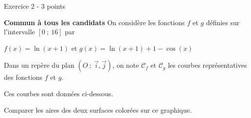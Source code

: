 
%
\begin{h2}Exercice 2 - 3 points\end{h2}
\textbf{Commun à tous les candidats}
On considère les fonctions $f$ et $g$ définies sur l'intervalle $[0~;~16]$ par
\begin{center}$f(x) = \ln(x+1) $ et $g(x) = \ln(x+1)+1-\cos(x)$\end{center}
Dans un repère du plan $(O~;~\vec{i},\vec{j})$, on note $\mathscr{C}_f$ et $\mathscr{C}_g$ les courbes représentatives des fonctions $f$ et $g$.
\par
Ces courbes sont données ci-dessous.

\begin{center}
\end{center}
Comparer les aires des deux surfaces colorées sur ce graphique.

